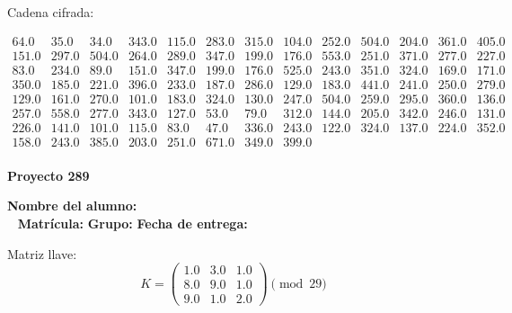 \documentclass[12pt]{article}
\begin{document}
Cadena cifrada:
\begin{center}
$\begin{array}{lllllllllllll}
64.0 & 35.0 & 34.0 & 343.0 & 115.0 & 283.0 & 315.0 & 104.0 & 252.0 & 504.0 & 204.0 & 361.0 & 405.0\\
151.0 & 297.0 & 504.0 & 264.0 & 289.0 & 347.0 & 199.0 & 176.0 & 553.0 & 251.0 & 371.0 & 277.0 & 227.0\\
83.0 & 234.0 & 89.0 & 151.0 & 347.0 & 199.0 & 176.0 & 525.0 & 243.0 & 351.0 & 324.0 & 169.0 & 171.0\\
350.0 & 185.0 & 221.0 & 396.0 & 233.0 & 187.0 & 286.0 & 129.0 & 183.0 & 441.0 & 241.0 & 250.0 & 279.0\\
129.0 & 161.0 & 270.0 & 101.0 & 183.0 & 324.0 & 130.0 & 247.0 & 504.0 & 259.0 & 295.0 & 360.0 & 136.0\\
257.0 & 558.0 & 277.0 & 343.0 & 127.0 & 53.0 & 79.0 & 312.0 & 144.0 & 205.0 & 342.0 & 246.0 & 131.0\\
226.0 & 141.0 & 101.0 & 115.0 & 83.0 & 47.0 & 336.0 & 243.0 & 122.0 & 324.0 & 137.0 & 224.0 & 352.0\\
158.0 & 243.0 & 385.0 & 203.0 & 251.0 & 671.0 & 349.0 & 399.0\\
\end{array}$
\end{center}

\newpage


\textbf{Proyecto 289}

\textbf{Nombre del alumno:} \underline{\hspace{13cm}}\\\
\vspace{1cm}
\textbf{Matrícula:} \underline{\hspace{4cm}} \hspace{1cm}
\textbf{Grupo:} \underline{\hspace{2cm}}
\textbf{Fecha de entrega:} \underline{\hspace{2cm}}

\medskip

Matriz llave:
\[
K = \begin{pmatrix}
1.0 & 3.0 & 1.0\\
8.0 & 9.0 & 1.0\\
9.0 & 1.0 & 2.0
\end{pmatrix} \pmod{29}
\]
\end{document}
